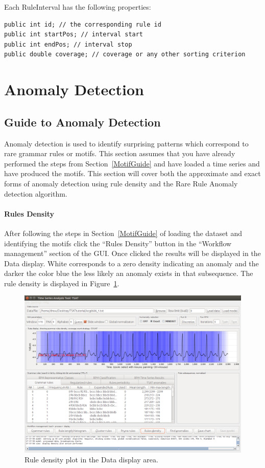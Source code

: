 \documentclass[titlepage, letterpaper, 12pt]{article}
\begin{document}
Each RuleInterval has the following properties:
\begin{lstlisting}
public int id; // the corresponding rule id
public int startPos; // interval start
public int endPos; // interval stop
public double coverage; // coverage or any other sorting criterion
\end{lstlisting}


\section{Anomaly Detection}
\label{AnomalyGuide}
\subsection{Guide to Anomaly Detection}

Anomaly detection is used to identify surprising patterns which correspond to rare grammar rules or motifs.  This section assumes that you have already performed the steps from Section~\ref{MotifGuide} and have loaded a time series and have produced the motifs.  This section will cover both the approximate and exact forms of anomaly detection using rule density and the Rare Rule Anomaly detection algorithm.


\paragraph{Rules Density} 

After following the steps in Section~\ref{MotifGuide} of loading the dataset and identifying the motifs click the ``Rules Density'' button in the ``Workflow management'' section of the GUI.  Once clicked the results will be displayed in the Data display.  White corresponds to a zero density indicating an anomaly and the darker the color blue the less likely an anomaly exists in that subsequence.  The rule density is displayed in Figure~\ref{fig:ruledensity}.

\begin{figure}[H]
	\centering
	\includegraphics[width=\textwidth]{pictures/motifguide/RuleDensity}
	\caption{Rule density plot in the Data display area.}
	\label{fig:ruledensity}
\end{figure}
\end{document}
